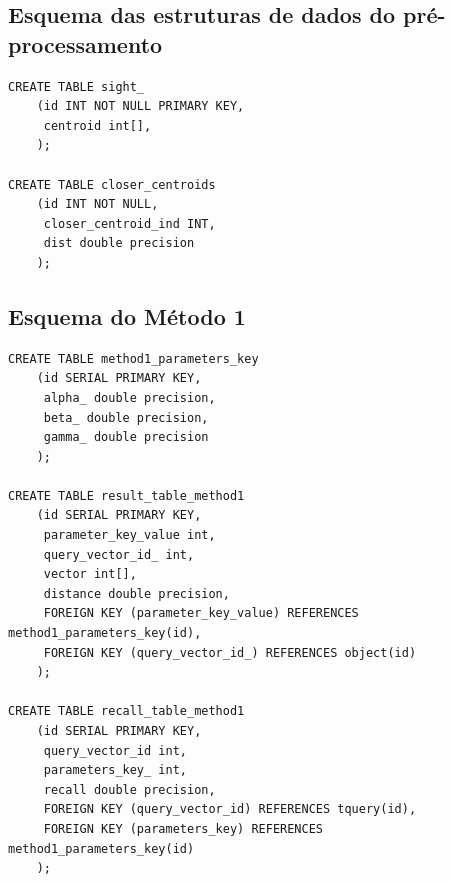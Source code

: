 \documentclass[a4paper,12pt,titlepage]{scrartcl}
\begin{document}
\subsection{Esquema das estruturas de dados do pré-processamento}\label{app0}

\begin{lstlisting}[caption = O esquema do pré-processamento, label = esqmet0]
CREATE TABLE sight_
	(id INT NOT NULL PRIMARY KEY,
	 centroid int[],
	);

CREATE TABLE closer_centroids 
	(id INT NOT NULL, 
	 closer_centroid_ind INT, 
	 dist double precision
	);
\end{lstlisting}
\vspace{5mm}

\subsection{Esquema do Método 1}\label{app1}


\begin{lstlisting}[caption = O esquema do Método 1, label = esqmet1]
CREATE TABLE method1_parameters_key 
	(id SERIAL PRIMARY KEY, 
	 alpha_ double precision,
	 beta_ double precision,
	 gamma_ double precision
	);

CREATE TABLE result_table_method1
	(id SERIAL PRIMARY KEY,
	 parameter_key_value int,
	 query_vector_id_ int,
	 vector int[],
	 distance double precision,
	 FOREIGN KEY (parameter_key_value) REFERENCES method1_parameters_key(id),
	 FOREIGN KEY (query_vector_id_) REFERENCES object(id)
	);

CREATE TABLE recall_table_method1
	(id SERIAL PRIMARY KEY,
	 query_vector_id int,
	 parameters_key_ int,
	 recall double precision,
	 FOREIGN KEY (query_vector_id) REFERENCES tquery(id),
	 FOREIGN KEY (parameters_key) REFERENCES method1_parameters_key(id)
	);

\end{lstlisting}
\vspace{5mm}
\end{document}
